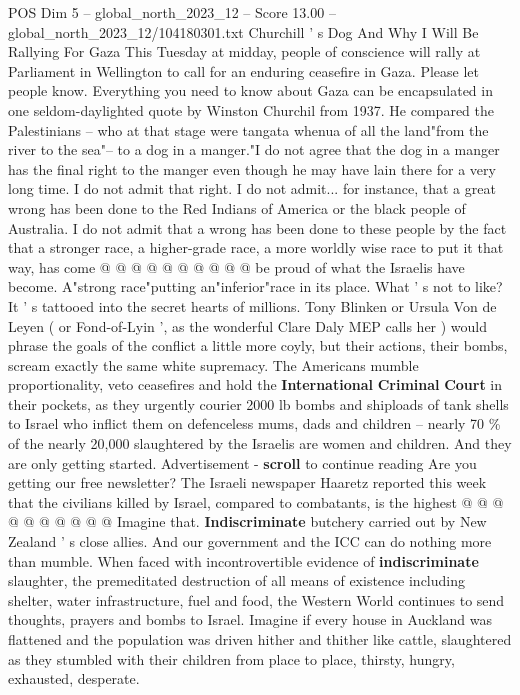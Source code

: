 \begin{textsample}{POS Dim 5 – global\_north\_2023\_12 – Score 13.00 – global\_north\_2023\_12/104180301.txt}  \label{ex:f5_pos_399}
Churchill ' s Dog And Why I Will Be Rallying For Gaza This Tuesday at midday, people of conscience will rally at Parliament in Wellington to call for an enduring ceasefire in Gaza.
Please let people know.
Everything you need to know about Gaza can be encapsulated in one seldom-daylighted quote by Winston Churchil from 1937.
He compared the Palestinians -- who at that stage were tangata whenua of all the land"from the river to the sea"-- to a dog in a manger."I do not agree that the dog in a manger has the final right to the manger even though he may have lain there for a very long time.
I do not admit that right.
I do not admit... for instance, that a great wrong has been done to the Red Indians of America or the black people of Australia.
I do not admit that a wrong has been done to these people by the fact that a stronger race, a higher-grade race, a more worldly wise race to put it that way, has come @ @ @ @ @ @ @ @ @ @ be proud of what the Israelis have become.
A"strong race"putting an"inferior"race in its place.
What ' s not to like?
It ' s tattooed into the secret hearts of millions.
Tony Blinken or Ursula Von de Leyen ( or Fond-of-Lyin ', as the wonderful Clare Daly MEP calls her ) would phrase the goals of the conflict a little more coyly, but their actions, their bombs, scream exactly the same white supremacy.
The Americans mumble proportionality, veto ceasefires and hold the \textbf{International} \textbf{Criminal} \textbf{Court} in their pockets, as they urgently courier 2000 lb bombs and shiploads of tank shells to Israel who inflict them on defenceless mums, dads and children -- nearly 70 \% of the nearly 20,000 slaughtered by the Israelis are women and children.
And they are only getting started.
Advertisement - \textbf{scroll} to continue reading Are you getting our free newsletter?
The Israeli newspaper Haaretz reported this week that the civilians killed by Israel, compared to combatants, is the highest @ @ @ @ @ @ @ @ @ @ Imagine that. \textbf{Indiscriminate} butchery carried out by New Zealand ' s close allies.
And our government and the ICC can do nothing more than mumble.
When faced with incontrovertible evidence of \textbf{indiscriminate} slaughter, the premeditated destruction of all means of existence including shelter, water infrastructure, fuel and food, the Western World continues to send thoughts, prayers and bombs to Israel.
Imagine if every house in Auckland was flattened and the population was driven hither and thither like cattle, slaughtered as they stumbled with their children from place to place, thirsty, hungry, exhausted, desperate.

\end{textsample}
